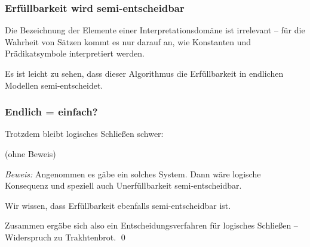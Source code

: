 \documentclass[onlymath]{beamer}
\begin{document}
\begin{frame}\frametitle{Erfüllbarkeit wird semi-entscheidbar}

Die Bezeichnung der Elemente einer Interpretationsdomäne ist irrelevant -- für die Wahrheit von Sätzen kommt es nur darauf an, wie Konstanten und Prädikatsymbole interpretiert werden.\bigskip\pause


Es ist leicht zu sehen, dass dieser Algorithmus die Erfüllbarkeit in endlichen Modellen semi-entscheidet.

\end{frame}

\begin{frame}\frametitle{Endlich = einfach?}\pause

Trotzdem bleibt logisches Schließen schwer:


(ohne Beweis)\pause\bigskip


\emph{Beweis:} Angenommen es gäbe ein solches System.\pause{} Dann wäre logische Konsequenz und speziell auch Unerfüllbarkeit semi-entscheidbar.\bigskip\pause

Wir wissen, dass Erfüllbarkeit ebenfalls semi-entscheidbar ist.\bigskip\pause

Zusammen ergäbe sich also ein Entscheidungsverfahren für logisches Schließen -- Widerspruch zu Trakhtenbrot.
\qed

\end{frame}
\end{document}
